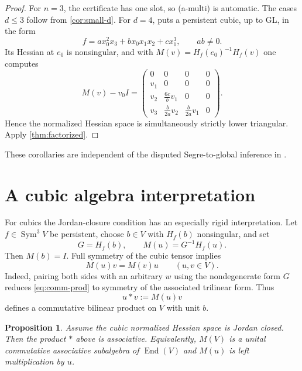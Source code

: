 \documentclass[11pt]{amsart}
\newtheorem{proposition}[theorem]{Proposition}
\newcommand{\Sym}{\operatorname{Sym}}
\newcommand{\End}{\operatorname{End}}
\begin{document}
\begin{proof}
For $n=3$, the certificate has one slot, so (a-multi) is automatic.  The cases
$d\le3$ follow from \cref{cor:small-d}.  For $d=4$, \cite[Theorem~5]{GO25}
puts a persistent cubic, up to $\mathrm{GL}$, in the form
\[
 f=a x_0^2x_3+b x_0x_1x_2+c x_1^3,\qquad ab\neq0.
\]
Its Hessian at $e_0$ is nonsingular, and with
$M(v)=H_f(e_0)^{-1}H_f(v)$ one computes
\[
 M(v)-v_0I=
 \begin{pmatrix}
 0&0&0&0\\
 v_1&0&0&0\\
 v_2&\frac{6c}{b}v_1&0&0\\
 v_3&\frac{b}{2a}v_2&\frac{b}{2a}v_1&0
 \end{pmatrix}.
\]
Hence the normalized Hessian space is simultaneously strictly lower triangular.
Apply \cref{thm:factorized}.
\end{proof}

These corollaries are independent of the disputed Segre-to-global inference in
\cite[Proposition~10]{G26}.

\section{A cubic algebra interpretation}

For cubics the Jordan-closure condition has an especially rigid interpretation.
Let $f\in\Sym^3V$ be persistent, choose $b\in V$ with $H_f(b)$ nonsingular, and
set
\[
 G=H_f(b),\qquad M(u)=G^{-1}H_f(u).
\]
Then $M(b)=I$.  Full symmetry of the cubic tensor implies
\begin{equation}\label{eq:comm-prod}
 M(u)v=M(v)u\qquad (u,v\in V).
\end{equation}
Indeed, pairing both sides with an arbitrary $w$ using the nondegenerate form
$G$ reduces \eqref{eq:comm-prod} to symmetry of the associated trilinear form.
Thus
\[
 u*v:=M(u)v
\]
defines a commutative bilinear product on $V$ with unit $b$.

\begin{proposition}\label{prop:cubic-assoc}
Assume the cubic normalized Hessian space is Jordan closed.  Then the product
$*$ above is associative.  Equivalently, $M(V)$ is a unital commutative
associative subalgebra of $\End(V)$ and $M(u)$ is left multiplication by $u$.
\end{proposition}
\end{document}
